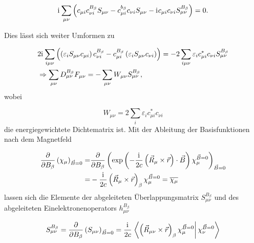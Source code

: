      \begin{equation}
     \mathrm{i}\mkern1mu\sum_{\mu\nu}\left(c_{\mu i}c_{\nu i}^{B_\beta}S_{\mu\nu}-c_{\mu i}^{b_\beta}c_{\nu i}S_{\mu\nu}-\mathrm{i}\mkern1mu c_{\mu i}c_{\nu i}S_{\mu\nu}^{B_\beta}\right)=0.
     \end{equation}
     
     Dies lässt sich weiter Umformen zu
     
     \begin{equation}
     \begin{aligned}
     &2\mathrm{i}\mkern1mu\sum_{i\mu\nu}\left(\left(\varepsilon_i S_{\mu\nu} c_{\mu i}\right) c_{\nu i}^{B_\beta} - c_{\mu i}^{B_\beta} \left(\varepsilon_i S_{\mu\nu} c_{\nu i}\right)\right)=-2\sum_{i\mu\nu}\varepsilon_i c_{\mu i}^*c_{\nu i}S_{\mu\nu}^{B_\beta}\\
     &\Rightarrow \sum_{\mu\nu}D_{\mu\nu}^{B_\beta}F_{\mu\nu}=-\sum_{\mu\nu}W_{\mu\nu} S_{\mu\nu}^{B_\beta},
     \end{aligned}
     \end{equation}
     wobei
     
     \begin{equation}
     W_{\mu\nu}=2\sum_{i}\varepsilon_i c_{\mu i}^*c_{\nu i}
     \end{equation}
     die energiegewichtete Dichtematrix ist.\supercite{pople1979derivative} Mit der Ableitung der Basisfunktionen nach dem Magnetfeld
     
     \begin{equation}
     \begin{aligned}
     \frac{\partial}{\partial B_\beta}\left(\chi_\mu\right)_{\vec{B}=0}=&\frac{\partial}{\partial B_\beta}\left(\exp\left(-\frac{\mathrm{i}\mkern1mu}{2c}\left(\vec{R}_\mu\times\vec{r} \right)\cdot \vec{B}\right)\chi_\mu^{\vec{B}=0}\right)_{\vec{B}=0}\\
     =&-\frac{\mathrm{i}\mkern1mu}{2c}\left(\vec{R}_\mu\times\vec{r}\right)_\beta\chi_\mu^{\vec{B}=0}=\overline{\chi_\mu}
     \end{aligned}
     \end{equation}
     lassen sich die Elemente der abgeleiteten Überlappungsmatrix $S_{\mu\nu}^{B_\beta}$ und des abgeleiteten Einelektronenoperators $h_{\mu\nu}^{B_\beta}$ 
     
     \begin{equation}
     S_{\mu\nu}^{B_\beta}=\frac{\partial}{\partial B_\beta} \left(S_{\mu\nu}\right)_{\vec{B}=0}=\frac{\mathrm{i}\mkern1mu}{2c}\left.\left\langle\left(\vec{R}_{\mu\nu}\times\vec{r}\right)_\beta\chi_\mu^{\vec{B}=0}\right\vert\chi_\nu^{\vec{B}=0}\right\rangle
     \end{equation}
  	 
